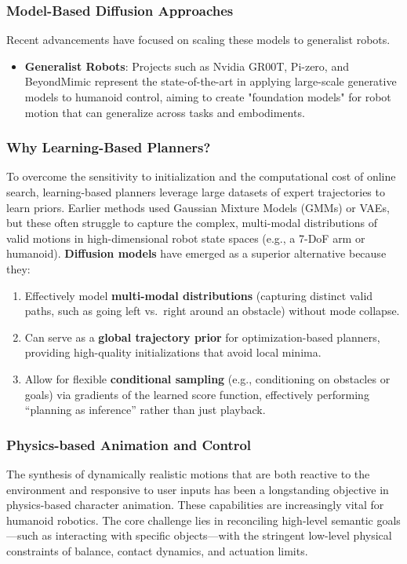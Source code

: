 \subsubsection{Model-Based Diffusion Approaches}
Recent advancements have focused on scaling these models to generalist robots.
\begin{itemize}
    \item \textbf{Generalist Robots}: Projects such as Nvidia GR00T, Pi-zero, and BeyondMimic represent the state-of-the-art in applying large-scale generative models to humanoid control, aiming to create "foundation models" for robot motion that can generalize across tasks and embodiments.
\end{itemize}

\subsubsection{Why Learning-Based Planners?}
To overcome the sensitivity
    to initialization and the computational cost of online search,
    learning-based planners leverage large datasets of expert
    trajectories to learn priors. Earlier methods used Gaussian Mixture
    Models (GMMs) or VAEs, but these often struggle to capture the
    complex, multi-modal distributions of valid motions in
    high-dimensional robot state spaces (e.g., a 7-DoF arm or humanoid).
    \textbf{Diffusion models} have emerged as a superior alternative
    because they:

    \begin{enumerate}
    \def\labelenumi{\arabic{enumi}.}
    \tightlist
    \item
      Effectively model \textbf{multi-modal distributions} (capturing
      distinct valid paths, such as going left vs.~right around an
      obstacle) without mode collapse.
    \item
      Can serve as a \textbf{global trajectory prior} for
      optimization-based planners, providing high-quality
      initializations that avoid local minima.
    \item
      Allow for flexible \textbf{conditional sampling} (e.g.,
      conditioning on obstacles or goals) via gradients of the learned
      score function, effectively performing ``planning as inference''
      rather than just playback.
    \end{enumerate}

\subsubsection{Physics-based Animation and Control}
The synthesis of
dynamically realistic motions that are both reactive to the environment
and responsive to user inputs has been a longstanding objective in
physics-based character animation. These capabilities are increasingly
vital for humanoid robotics. The core challenge lies in reconciling
high-level semantic goals---such as interacting with specific
objects---with the stringent low-level physical constraints of balance,
contact dynamics, and actuation limits.

